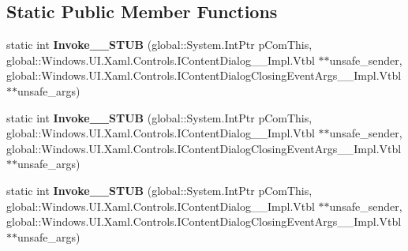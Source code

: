 \subsection*{Static Public Member Functions}
\begin{DoxyCompactItemize}
\item 
\mbox{\label{struct_windows_1_1_foundation_1_1_typed_event_handler___a___windows___u_i___xaml___controls___co9111ad08139b8b08fa2d56786ea22dd0_a454bd13651d402c529747d41a5c05eeb}} 
static int {\bfseries Invoke\+\_\+\+\_\+\+S\+T\+UB} (global\+::\+System.\+Int\+Ptr p\+Com\+This, global\+::\+Windows.\+U\+I.\+Xaml.\+Controls.\+I\+Content\+Dialog\+\_\+\+\_\+\+Impl.\+Vtbl $\ast$$\ast$unsafe\+\_\+sender, global\+::\+Windows.\+U\+I.\+Xaml.\+Controls.\+I\+Content\+Dialog\+Closing\+Event\+Args\+\_\+\+\_\+\+Impl.\+Vtbl $\ast$$\ast$unsafe\+\_\+args)
\item 
\mbox{\label{struct_windows_1_1_foundation_1_1_typed_event_handler___a___windows___u_i___xaml___controls___co9111ad08139b8b08fa2d56786ea22dd0_a454bd13651d402c529747d41a5c05eeb}} 
static int {\bfseries Invoke\+\_\+\+\_\+\+S\+T\+UB} (global\+::\+System.\+Int\+Ptr p\+Com\+This, global\+::\+Windows.\+U\+I.\+Xaml.\+Controls.\+I\+Content\+Dialog\+\_\+\+\_\+\+Impl.\+Vtbl $\ast$$\ast$unsafe\+\_\+sender, global\+::\+Windows.\+U\+I.\+Xaml.\+Controls.\+I\+Content\+Dialog\+Closing\+Event\+Args\+\_\+\+\_\+\+Impl.\+Vtbl $\ast$$\ast$unsafe\+\_\+args)
\item 
\mbox{\label{struct_windows_1_1_foundation_1_1_typed_event_handler___a___windows___u_i___xaml___controls___co9111ad08139b8b08fa2d56786ea22dd0_a454bd13651d402c529747d41a5c05eeb}} 
static int {\bfseries Invoke\+\_\+\+\_\+\+S\+T\+UB} (global\+::\+System.\+Int\+Ptr p\+Com\+This, global\+::\+Windows.\+U\+I.\+Xaml.\+Controls.\+I\+Content\+Dialog\+\_\+\+\_\+\+Impl.\+Vtbl $\ast$$\ast$unsafe\+\_\+sender, global\+::\+Windows.\+U\+I.\+Xaml.\+Controls.\+I\+Content\+Dialog\+Closing\+Event\+Args\+\_\+\+\_\+\+Impl.\+Vtbl $\ast$$\ast$unsafe\+\_\+args)
\item 

\end{DoxyCompactItemize}
